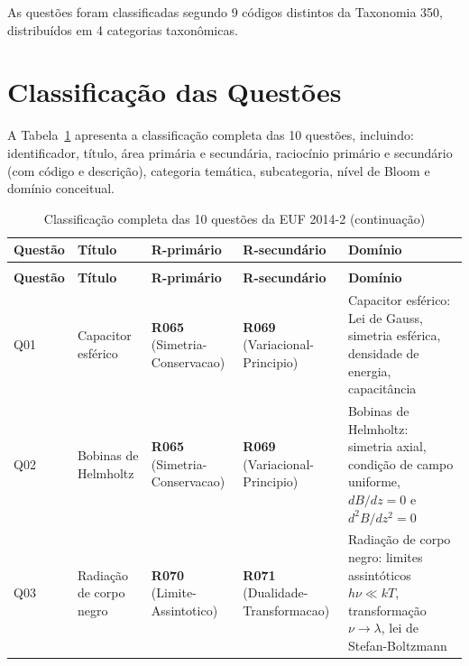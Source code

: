 \documentclass[12pt,a4paper]{article}
\newcommand{\rcode}[1]{\textcolor{azulprof}{\textbf{#1}}}
\begin{document}
As questões foram classificadas segundo 9 códigos distintos da Taxonomia
350, distribuídos em 4 categorias taxonômicas.

\section{Classificação das Questões}

A Tabela~\ref{tab:questoes} apresenta a classificação completa das 10
questões, incluindo: identificador, título, área primária e secundária,
raciocínio primário e secundário (com código e descrição), categoria
temática, subcategoria, nível de Bloom e domínio conceitual.

\small
\begin{longtable}{@{}p{1.5cm}p{2.8cm}p{2.5cm}p{2.5cm}p{5.2cm}@{}}
\caption{Classificação completa das 10 questões da EUF 2014-2}
\label{tab:questoes}\\
\toprule
\textbf{Questão} & \textbf{Título} & \textbf{R-primário} & \textbf{R-secundário} & \textbf{Domínio} \\
\midrule
\endfirsthead

\caption[]{Classificação completa das 10 questões da EUF 2014-2 (continuação)}\\
\toprule
\textbf{Questão} & \textbf{Título} & \textbf{R-primário} & \textbf{R-secundário} & \textbf{Domínio} \\
\midrule
\endhead

\bottomrule
\endfoot

Q01 & Capacitor esférico
  & \rcode{R065} (Simetria-Conservacao)
  & \rcode{R069} (Variacional-Principio)
  & Capacitor esférico: Lei de Gauss, simetria esférica,
    densidade de energia, capacitância \\
\midrule

Q02 & Bobinas de Helmholtz
  & \rcode{R065} (Simetria-Conservacao)
  & \rcode{R069} (Variacional-Principio)
  & Bobinas de Helmholtz: simetria axial, condição de campo
    uniforme, $dB/dz=0$ e $d^2B/dz^2=0$ \\
\midrule

Q03 & Radiação de corpo negro
  & \rcode{R070} (Limite-Assintotico)
  & \rcode{R071} (Dualidade-Transformacao)
  & Radiação de corpo negro: limites assintóticos
    $h\nu\ll kT$, transformação $\nu\to\lambda$, lei de
    Stefan-Boltzmann \\
\midrule


\end{longtable}
\end{document}

